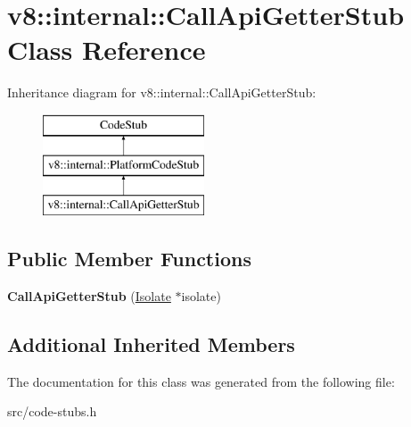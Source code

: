 \hypertarget{classv8_1_1internal_1_1_call_api_getter_stub}{}\section{v8\+:\+:internal\+:\+:Call\+Api\+Getter\+Stub Class Reference}
\label{classv8_1_1internal_1_1_call_api_getter_stub}
Inheritance diagram for v8\+:\+:internal\+:\+:Call\+Api\+Getter\+Stub\+:\begin{figure}[H]
\begin{center}
\leavevmode
\includegraphics[height=3.000000cm]{classv8_1_1internal_1_1_call_api_getter_stub}
\end{center}
\end{figure}
\subsection*{Public Member Functions}
\begin{DoxyCompactItemize}
\item 
\hypertarget{classv8_1_1internal_1_1_call_api_getter_stub_aed59e1641ccf8d40b949d0193542d638}{}{\bfseries Call\+Api\+Getter\+Stub} (\hyperlink{classv8_1_1internal_1_1_isolate}{Isolate} $\ast$isolate)\label{classv8_1_1internal_1_1_call_api_getter_stub_aed59e1641ccf8d40b949d0193542d638}

\end{DoxyCompactItemize}
\subsection*{Additional Inherited Members}


The documentation for this class was generated from the following file\+:\begin{DoxyCompactItemize}
\item 
src/code-\/stubs.\+h\end{DoxyCompactItemize}
